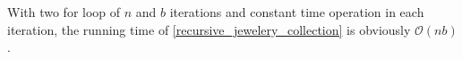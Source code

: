 \begin{homeworkProblem}
With two for loop of $n$ and $b$ iterations and constant time operation in each iteration, the running time of \cref{recursive_jewelery_collection} is obviously $\mathcal{O}(nb)$.

\end{homeworkProblem}
